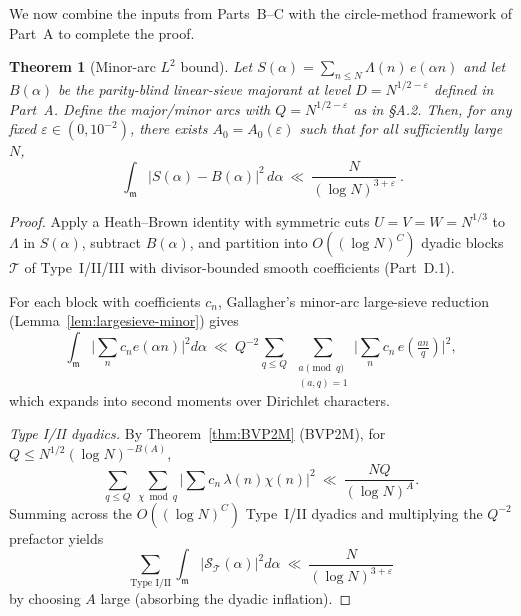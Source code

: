 \documentclass[11pt]{article}
\newtheorem{theorem}[lemma]{Theorem}
\theoremstyle{definition}
\theoremstyle{remark}
\numberwithin{equation}{part}
\begin{document}
We now combine the inputs from Parts~B--C with the circle-method framework of Part~A to complete the proof.

\begin{theorem}[Minor-arc $L^2$ bound]\label{thm:minorA1_proved}
	Let $S(\alpha)=\sum_{n\le N}\Lambda(n)\,e(\alpha n)$ and let $B(\alpha)$ be the parity-blind linear-sieve majorant at level $D=N^{1/2-\varepsilon}$ defined in Part~A.
	Define the major/minor arcs with $Q=N^{1/2-\varepsilon}$ as in \S A.2.
	Then, for any fixed $\varepsilon\in (0,10^{-2})$, there exists $A_0=A_0(\varepsilon)$ such that for all sufficiently large $N$,
	\[
		\boxed{\ \ \int_{\mathfrak m}\!\bigl|S(\alpha)-B(\alpha)\bigr|^{2}\,d\alpha
			\ \ll\ \frac{N}{(\log N)^{3+\varepsilon}}\ .\ }
	\]
\end{theorem}

\begin{proof}
	Apply a Heath–Brown identity with symmetric cuts $U=V=W=N^{1/3}$ to $\Lambda$ in $S(\alpha)$, subtract $B(\alpha)$, and partition into $O((\log N)^C)$ dyadic blocks $\mathcal T$ of Type~I/II/III with divisor-bounded smooth coefficients (Part~D.1).

	For each block with coefficients $c_n$, Gallagher’s minor-arc large-sieve reduction (Lemma~\ref{lem:largesieve-minor}) gives
	\[
		\int_{\mathfrak m}\Big|\sum_n c_n e(\alpha n)\Big|^2 d\alpha
		\ \ll\ Q^{-2}\!
		\sum_{q\le Q}\ \sum_{\substack{a\!\!\!\pmod q\\ (a,q)=1}}
		\Big|\sum_n c_n\,e\!\left(\tfrac{an}{q}\right)\Big|^2,
	\]
	which expands into second moments over Dirichlet characters.

	\emph{Type I/II dyadics.} By Theorem~\ref{thm:BVP2M} (BVP2M), for $Q\le N^{1/2}(\log N)^{-B(A)}$,
	\[
		\sum_{q\le Q}\ \sum_{\chi\bmod q}\Big|\sum c_n\,\lambda(n)\chi(n)\Big|^2
		\ \ll\ \frac{NQ}{(\log N)^A}.
	\]
	Summing across the $O((\log N)^C)$ Type~I/II dyadics and multiplying the $Q^{-2}$ prefactor yields
	\[
		\sum_{\text{Type I/II}}\int_{\mathfrak m}|\mathcal S_{\mathcal T}(\alpha)|^2 d\alpha
		\ \ll\ \frac{N}{(\log N)^{3+\varepsilon}}
	\]
	by choosing $A$ large (absorbing the dyadic inflation).


\end{proof}
\end{document}
